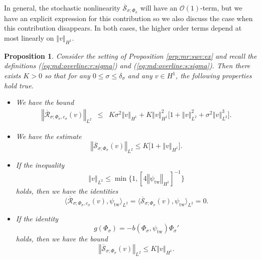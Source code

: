\documentclass[10pt]{articleHJ}
\renewcommand{\O}{\ensuremath{\mathcal{O}}}
\newcommand{\norm}[1]{\left\Vert#1\right\Vert}		%
\newcommand{\sref}[1]{(\ref{#1})}                       %
\newtheorem{prop}[thm]{Proposition}
\numberwithin{equation}{section}
\begin{document}
In general, the stochastic nonlinearity
$\overline{\mathcal{S}}_{\sigma;\Phi_{\sigma}}$
will have an $\O(1)$-term, but we have
an explicit expression for this contribution so we also discuss the case when this contribution disappears.
In both cases, the higher order terms
depend at most linearly on $\norm{v}_{H^1}$.



\begin{prop}
\label{prp:fnl:bnds}
Consider the setting
of Proposition \ref{prp:mr:swv:ex}
and recall the definitions
\sref{eq:md:overline:r:sigma}
and \sref{eq:md:overline:s:sigma}.
Then there exists $K > 0$
so that for any
$0 \le \sigma \le \delta_{\sigma}$
and any
$v \in H^1$,
the following properties hold true.
\begin{itemize}
\item[(i)]{
We have the bound
\begin{equation}
\label{eq:fnl:rs:glb}
\begin{array}{lcl}
\norm{
\overline{\mathcal{R}}_{\sigma;
 \Phi_{\sigma}, c_{\sigma}}(v)
}_{L^2}
& \le &
 K \sigma^2 \norm{v}_{H^1}
+ K \norm{v}_{H^1}^2 \big[
  1
  + \norm{v}_{L^2}^2
  + \sigma^2 \norm{v}_{L^2}^3
\big].
\end{array}
\end{equation}
}
\item[(ii)]{
We have the estimate
\begin{equation}
\norm{
\overline{\mathcal{S}}_{\sigma;
 \Phi_{\sigma}}(v)
}_{L^2}
\le K\big[ 1 +  \norm{v}_{H^1}
  \big].
\end{equation}
}
\item[(iii)]{
  If the inequality
  \begin{equation}
    \norm{v}_{L^2}
      \le \min \{ 1 , [4 \norm{\psi_{\mathrm{tw}}}_{H^1}]^{-1} \}
  \end{equation}
  holds, then we have
  the identities
  \begin{equation}
    \langle \overline{\mathcal{R}}_{\sigma;
    \Phi_{\sigma}, c_{\sigma}}(v) , \psi_{\mathrm{tw}} \rangle_{L^2}
    =
    \langle \overline{\mathcal{S}}_{\sigma;
     \Phi_{\sigma}}(v) , \psi_{\mathrm{tw}} \rangle_{L^2} = 0.
  \end{equation}
}
\item[(iv)]{
  If the identity
  \begin{equation}
    \label{eq:fnl:cond:for:sp:case}
    g(\Phi_{\sigma}) = - b(\Phi_{\sigma}, \psi_{\mathrm{tw}} ) \Phi_{\sigma}'
  \end{equation}
  holds,
  then we have the bound
  \begin{equation}
     \norm{
        \overline{\mathcal{S}}_{\sigma;
       \Phi_{\sigma}}(v)
       }_{L^2}
        \le K  \norm{v}_{H^1} .
   \end{equation}
}
\end{itemize}
\end{prop}
\end{document}
